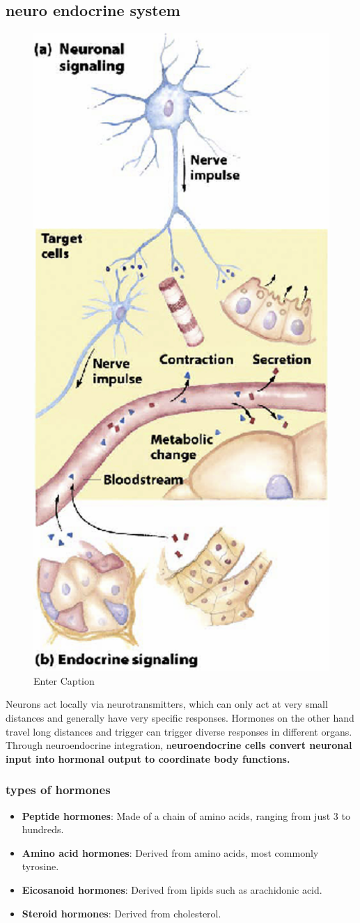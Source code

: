 \documentclass[../main.tex]{subfiles}
\begin{document}
\subsection{neuro endocrine system}
\begin{figure}[H]
    \centering
    \includegraphics[width=0.3\linewidth]{NeuroEndocrineSystem.png}
    \caption{Enter Caption}
    \label{fig:enter-label}
\end{figure}
Neurons act locally via neurotransmitters, which can only act at very small distances and generally have very specific responses. Hormones on the other hand travel long distances and trigger can trigger diverse responses in different organs. Through neuroendocrine integration, n\textbf{euroendocrine cells convert neuronal input into hormonal output to coordinate body functions.}
\subsubsection{types of hormones}
\begin{itemize}
    \item \textbf{Peptide hormones}: Made of a chain of amino acids, ranging from just 3 to hundreds.
    \item \textbf{Amino acid hormones}: Derived from amino acids, most commonly tyrosine.
    \item \textbf{Eicosanoid hormones}: Derived from lipids such as arachidonic acid.
    \item \textbf{Steroid hormones}: Derived from cholesterol.
\end{itemize}
\end{document}
